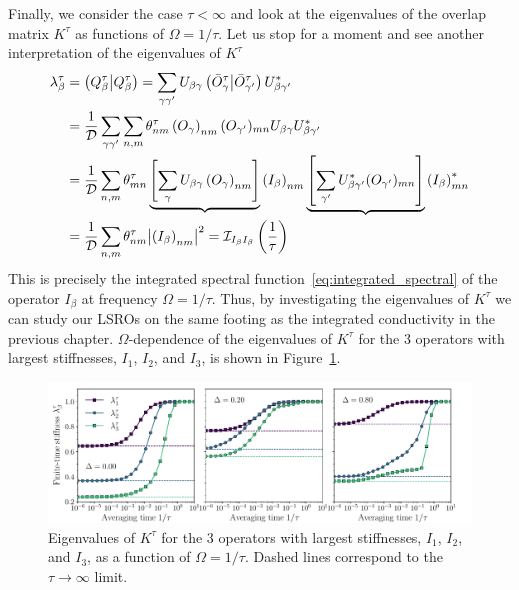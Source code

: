 Finally, we consider the case \(\tau < \infty\) and look at the eigenvalues
of the overlap matrix \(K^{\tau}\) as functions of \(\Omega = 1/\tau\). Let us stop
for a moment and see another interpretation of the eigenvalues of \(K^{\tau}\)
\begin{align}
  \lambda^{\tau}_{\beta} & = \left(Q_{\beta}^{\tau} \middle| Q_{\beta}^{\tau}\right) = \sum_{\gamma\gamma^{\prime}}
  U_{\beta\gamma}\left(\bar{O}^{\tau}_{\gamma} \middle| \bar{O}^{\tau}_{\gamma^{\prime}}\right){U}^{\ast}_{\beta\gamma^{\prime}}\nonumber                                                                         \\
                         & = \frac{1}{\mathcal{D}} \sum_{\gamma\gamma^{\prime}}\sum_{n,m} \theta_{nm}^{\tau}
  \left(O_{\gamma}\right)_{nm} (O_{\gamma^{\prime}})_{mn} U_{\beta\gamma} {U}^{\ast}_{\beta\gamma^{\prime}}\nonumber                                                                              \\
                         & = \frac{1}{\mathcal{D}} \sum_{n,m} \theta_{mn}^{\tau} \underbrace{\left[\sum_{\gamma}U_{\beta\gamma} \left(O_{\gamma}\right)_{nm}\right]}{\left(I_{\beta}\right)_{nm}}
  \underbrace{\left[\sum_{\gamma^{\prime}}{U}^{\ast}_{\beta\gamma^{\prime}} (O_{\gamma^{\prime}})_{mn}\right]}{\left(I_{\beta}\right)^{\ast}_{mn}}\nonumber                                       \\
                         & = \frac{1}{\mathcal{D}} \sum_{n,m} \theta_{nm}^{\tau} \abs{\left(I_{\beta}\right)_{nm}}^2 = \mathcal{I}_{I_{\beta}I_{\beta}}\left(\frac{1}{\tau}\right)
\end{align}
This is precisely the integrated spectral function~\eqref{eq:integrated_spectral} of the operator \(I_{\beta}\) at frequency \(\Omega = 1/\tau\).
Thus, by investigating the eigenvalues of \(K^{\tau}\) we can study our LSROs on the same footing as the integrated
conductivity in the previous chapter. \(\Omega\)-dependence of the eigenvalues of \(K^{\tau}\) for the 3 operators
with largest stiffnesses, \(I_1\), \(I_2\), and \(I_3\), is shown in Figure~\ref{fig:lsro_eigenvalues}.

\begin{figure}[htbp]
  \centering
  \includegraphics[width=\linewidth]{Figures/finite_time_stiffness.pdf}
  \caption{Eigenvalues of \(K^{\tau}\) for the 3 operators with largest stiffnesses, \(I_1\), \(I_2\), and \(I_3\),
    as a function of \(\Omega = 1/\tau\). Dashed lines correspond to the \(\tau\to\infty\) limit.}
  \label{fig:lsro_eigenvalues}
\end{figure}


